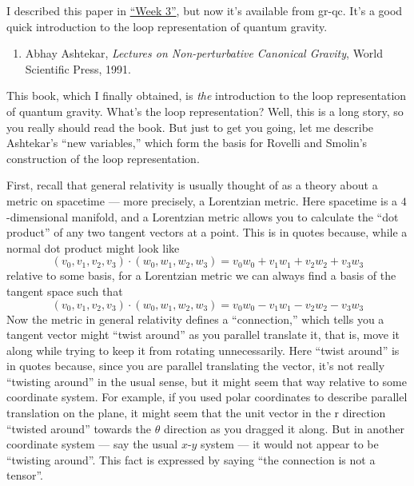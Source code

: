 \documentclass[12pt]{article}
\def\tightlist{}
\begin{document}
I described this paper in \protect\hyperlink{week3}{``Week 3''}, but now
it's available from gr-qc. It's a good quick introduction to the loop
representation of quantum gravity.

\begin{enumerate}
\def\labelenumi{\arabic{enumi})}
\setcounter{enumi}{1}
\tightlist
\item
  Abhay Ashtekar, \emph{Lectures on Non-perturbative Canonical Gravity}, World Scientific Press, 1991.
\end{enumerate}

This book, which I finally obtained, is \emph{the} introduction to the
loop representation of quantum gravity. What's the loop representation?
Well, this is a long story, so you really should read the book. But just
to get you going, let me describe Ashtekar's ``new variables,'' which
form the basis for Rovelli and Smolin's construction of the loop
representation.

First, recall that general relativity is usually thought of as a theory
about a metric on spacetime --- more precisely, a Lorentzian metric.
Here spacetime is a \(4\)-dimensional manifold, and a Lorentzian metric
allows you to calculate the ``dot product'' of any two tangent vectors
at a point. This is in quotes because, while a normal dot product might
look like
\[(v_0,v_1,v_2,v_3)\cdot(w_0,w_1,w_2,w_3) = v_0w_0 + v_1w_1 + v_2w_2 + v_3w_3\]
relative to some basis, for a Lorentzian metric we can always find a
basis of the tangent space such that
\[(v_0,v_1,v_2,v_3)\cdot(w_0,w_1,w_2,w_3) = v_0w_0 -v_1w_1 -v_2w_2 -v_3w_3\]
Now the metric in general relativity defines a ``connection,'' which
tells you a tangent vector might ``twist around'' as you parallel
translate it, that is, move it along while trying to keep it from
rotating unnecessarily. Here ``twist around'' is in quotes because,
since you are parallel translating the vector, it's not really
``twisting around'' in the usual sense, but it might seem that way
relative to some coordinate system. For example, if you used polar
coordinates to describe parallel translation on the plane, it might seem
that the unit vector in the r direction ``twisted around'' towards the
\(\theta\) direction as you dragged it along. But in another coordinate
system --- say the usual \(x\)-\(y\) system --- it would not appear to
be ``twisting around''. This fact is expressed by saying ``the
connection is not a tensor''.
\end{document}
